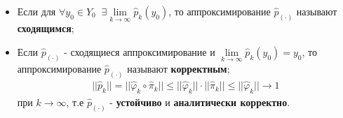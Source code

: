 \begin{itemize}
	\item Если для $\forall y_0\in Y_0 \;\;\exists \lim\limits_{k\to\infty}\hat{p}_k(y_0)$, то аппроксимирование $\hat{p}_{(\cdot)}$ называют \textbf{сходящимся};
	\item Если $\hat{p}_{(\cdot)}$ - сходящиеся аппроксимирование и $\lim\limits_{k\to\infty}\hat{p}_k(y_0) = y_0$, то аппроксимирование $\hat{p}_{(\cdot)}$ называют \textbf{корректным};
	\begin{gather*}
	||\hat{p}_k|| = ||\hat{\varphi}_k \circ \hat{\pi}_k|| \leq ||\hat{\varphi}_k|| \cdot ||\hat{\pi}_k|| \leq ||\hat{\varphi}_k|| \rightarrow 1	
	\end{gather*}
	при $k\to\infty$, т.е $\hat{p}_{(\cdot)}$ - \textbf{устойчиво} и \textbf{аналитически корректно}.
\end{itemize}


